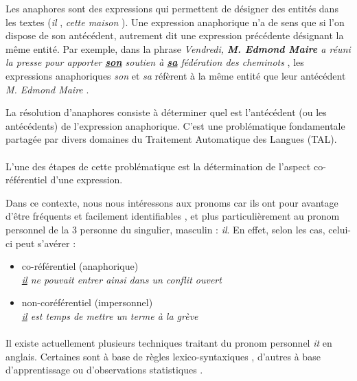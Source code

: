 \documentclass[a4paper,12pt]{article}
\begin{document}
Les anaphores sont des expressions qui permettent de désigner des entités dans les textes (\og \textit{il} \fg{}, \og \textit{cette maison} \fg{}). Une expression anaphorique n'a de sens que si l'on dispose de son antécédent, autrement dit une expression précédente désignant la même entité. Par exemple, dans la phrase \og \textit{Vendredi, \textbf{M. Edmond Maire} a réuni la presse pour apporter \underline{\textbf{son}} soutien à \underline{\textbf{sa}} fédération des cheminots} \fg{}, les expressions anaphoriques \og \textit{son} \fg{} et \og \textit{sa} \fg{} réfèrent à la même entité que leur antécédent \og \textit{M. Edmond Maire} \fg{}.

La résolution d'anaphores consiste à déterminer quel est l'antécédent (ou les antécédents) de l'expression anaphorique. C'est une problématique fondamentale partagée par divers domaines du Traitement Automatique des Langues (TAL).

\paragraph{}
L'une des étapes de cette problématique est la détermination de l'aspect co-référentiel d'une expression.

Dans ce contexte, nous nous intéressons aux pronoms car ils ont pour avantage d'être fréquents et facilement identifiables \citep{danlos-ilimp-taln2005}, et plus particulièrement au pronom personnel de la 3 personne du singulier, masculin : \og{}\textit{il}\fg{}. 
En effet, selon les cas, celui-ci peut s'avérer : 
\begin{itemize}
 \item co-référentiel (anaphorique)\\ \og{}\textit{\underline{il} ne pouvait entrer ainsi dans un conflit ouvert}\fg{}
 \item non-coréférentiel (impersonnel)\\ \og{}\textit{\underline{il} est temps de mettre un terme à la grève}\fg{}
\end{itemize}

\paragraph{}
Il existe actuellement plusieurs techniques traitant du pronom personnel \og{}\textit{it}\fg{} en anglais.
Certaines sont à base de règles lexico-syntaxiques \citep{Lappin-1994-APA-203987.203989}, d'autres à base d'apprentissage \citep{Li-2009-IPU-1622716.1622726} ou d'observations statistiques \citep{Bergsma-11}.
\end{document}
